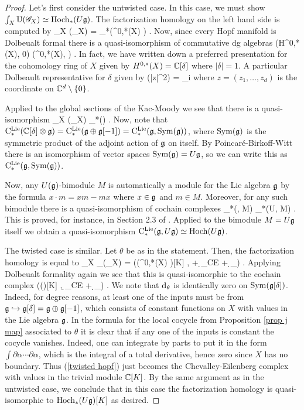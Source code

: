 \begin{proof}
Let's first consider the untwisted case.
In this case, we must show $\int_X \mathbb U (\mathscr G_X) \simeq {\rm Hoch}_*(U \mathfrak g)$.
The factorization homology on the left hand side is computed by
\ben
\int_X \UU(\sG_X) = \clieu_*(\Omega^{0,*}(X) \tensor \fg) .
\een
Now, since every Hopf manifold is Dolbeualt formal there is a quasi-isomorphism of commutative dg algebras
\ben
\left(H^{0,*}(X), 0\right) \simeq \left(\Omega^{0,*}(X), \dbar\right) .
\een
In fact, we have written down a preferred presentation for the cohomology ring of $X$ given by $H^{0,*}(X) = \mathbb C[\delta]$ where $|\delta| = 1$.
A particular Dolbeault representative for $\delta$ given by
\ben
\dbar (\log |z|^2) = \sum_i 
\een
where $z = (z_1,\ldots,z_d)$ is the coordinate on $\mathbb C^d \setminus \{0\}$. 

Applied to the global sections of the Kac-Moody we see that there is a quasi-isomorphism
\ben
\int_X \UU(\sG_X) \simeq \clieu_*(\CC[\delta] \tensor \fg) .
\een
Now, note that ${\rm C}^{\rm Lie}_*(\mathbb C[\delta] \otimes \mathfrak g) = {\rm C}^{\rm Lie}_*(\mathfrak g \oplus \mathfrak g[-1]) = {\rm C}^{\rm Lie}_*(\mathfrak g, {\rm Sym} (\mathfrak g))$, where ${\rm Sym}(\mathfrak g)$ is the symmetric product of the adjoint action of $\mathfrak g$ on itself. 
By Poincar\'{e}-Birkoff-Witt there is an isomorphism of vector spaces ${\rm Sym}(\mathfrak g) = U \mathfrak g$, so we can write this as ${\rm C}^{\rm Lie}_*(\mathfrak g, {\rm Sym} (\mathfrak g))$.

Now, any $U(\mathfrak g)$-bimodule $M$ is automatically a module for the Lie algebra $\mathfrak g$ by the formula $x \cdot m = xm - mx$ where $x \in \mathfrak g$ and $m \in M$.
Moreover, for any such bimodule there is a quasi-isomorphism of cochain complexes 
\ben
\clieu_*(\fg, M) _*(U\fg, M) .
\een
This is proved, for instance, in Section 2.3 of \cite{lectETH}.
Applied to the bimodule $M = U\mathfrak g$ itself we obtain a quasi-isomorphism ${\rm C}^{\rm Lie}_*(\mathfrak g , U\mathfrak g) \simeq {\rm Hoch}(U\mathfrak g)$.

The twisted case is similar. 
Let $\theta$ be as in the statement.
Then, the factorization homology is equal to
\ben
\int_X \UU_\theta (\sG_X) = \left(\Sym(\Omega^{0,*}(X) \tensor \fg)[K] , \dbar + \d_{CE} + \d_\theta\right) .
\een
Applying Dolbeualt formality again we see that this is quasi-isomorphic to the cochain complex
\be\label{twisted hopf}
\left(\Sym(\fg[\delta])[K] ,  \d_{CE} + \d_\theta \right) .
\ee
We note that ${\rm d}_\theta$ is identically zero on ${\rm Sym}(\mathfrak g[\delta])$. 
Indeed, for degree reasons, at least one of the inputs must be from $\mathfrak g \hookrightarrow \mathfrak g[\delta] = \mathfrak g \oplus \mathfrak g[-1]$, which consists of constant functions on $X$ with values in the Lie algebra $\mathfrak g$. 
In the formula for the local cocycle from Proposition \ref{prop j map} associated to $\theta$ it is clear that if any one of the inputs is constant the cocycle vanishes. 
Indeed, one can integrate by parts to put it in the form $\int \partial \alpha \cdots \partial \alpha$, which is the integral of a total derivative, hence zero since $X$ has no boundary.
Thus (\ref{twisted hopf}) just becomes the Chevalley-Eilenberg complex with values in the trivial module $\mathbb C[K]$. 
By the same argument as in the untwisted case, we conclude that in this case the factorization homology is quasi-isomorphic to ${\rm Hoch}_*(U \mathfrak g)[K]$ as desired.
\end{proof}

